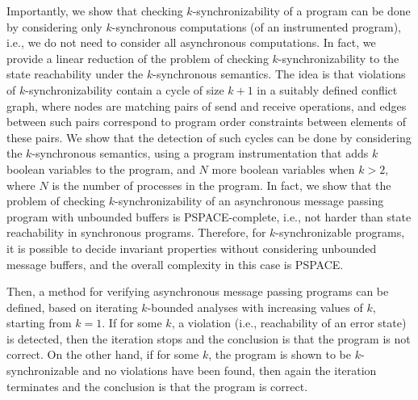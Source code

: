 Importantly, we show that checking $k$-synchronizability of a program can be done by considering only $k$-synchronous computations (of an instrumented program), i.e., we do not need to consider all asynchronous  computations. In fact, we provide a linear reduction of the problem of checking $k$-synchronizability to the state reachability under the $k$-synchronous semantics. The idea is that violations of $k$-synchronizability contain a cycle of size $k+1$ in a suitably defined conflict graph, where nodes are matching pairs of send and receive operations, and edges between such pairs correspond to program order constraints between elements of these pairs. We show that the detection of such cycles can be done by considering the $k$-synchronous semantics, using a program instrumentation that adds $k$ boolean variables to the program, and $N$ more boolean variables when $k>2$, where $N$ is the number of processes in the program. In fact, we show that the problem of checking $k$-synchronizability of an asynchronous message passing program with unbounded buffers is PSPACE-complete, i.e., not harder than state reachability in synchronous programs. Therefore, for $k$-synchronizable programs, it is possible to decide invariant properties without considering unbounded message buffers, and the overall complexity in this case is PSPACE. 

Then, a method for verifying asynchronous message passing programs can be defined, 
based on iterating $k$-bounded analyses with increasing values of $k$, starting from $k=1$. If for some $k$, a violation (i.e., reachability of an error state) is detected, then the iteration stops and the conclusion is that the program is not correct. On the other hand, if for some $k$, the program is shown to be $k$-synchronizable and no violations have been found, then again the iteration terminates and the conclusion is that the program is correct. 

